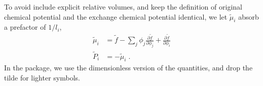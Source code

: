 \documentclass[reprint,onecolumn,groupedaddress,amsmath,amssymb]{revtex4-2}
\begin{document}
To avoid include explicit relative volumes, and keep the definition of original chemical potential and the exchange chemical potential identical, we let $\tilde{\mu}_i$ absorb a prefactor of $1/l_i$, 
\begin{subequations}
    \begin{align}
        \tilde{\mu}_i &=  \tilde{f} - \sum_j \phi_j \frac{\partial \tilde{f}}{\partial \phi_j} + \frac{\partial \tilde{f}}{\partial \phi_i} \\
        \tilde{P}_i &= - \tilde{\mu}_i \;.
    \end{align}
\end{subequations} 
In the package, we use the dimensionless version of the quantities, and drop the tilde for lighter symbols.
\end{document}
